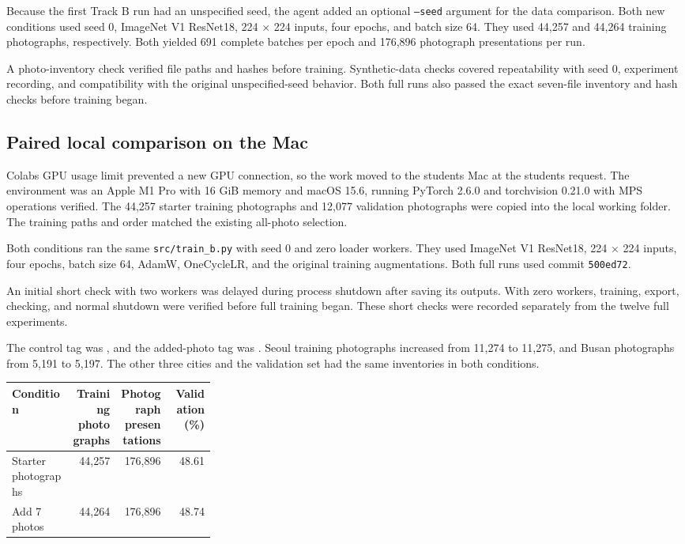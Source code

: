 \documentclass[11pt]{article}
\begin{document}
Because the first Track B run had an unspecified seed, the agent added an
optional \texttt{--seed} argument for the data comparison. Both new conditions
used seed 0, ImageNet V1 ResNet18, 224 $\times$ 224 inputs, four epochs, and
batch size 64. They used 44,257 and 44,264 training photographs, respectively.
Both yielded 691 complete batches per epoch and 176,896 photograph
presentations per run.

A photo-inventory check verified file paths and hashes before training.
Synthetic-data checks covered repeatability with seed 0, experiment recording,
and compatibility with the original unspecified-seed behavior. Both full
runs also passed the exact seven-file inventory and hash checks before
training began.

\subsection{Paired local comparison on the Mac}

Colab\textquotesingle{}s GPU usage limit prevented a new GPU connection, so the work moved to
the student\textquotesingle{}s Mac at the student\textquotesingle{}s request. The environment was an Apple
M1 Pro with 16 GiB memory and macOS 15.6, running PyTorch 2.6.0 and torchvision
0.21.0 with MPS operations verified. The 44,257 starter training photographs
and 12,077 validation photographs were copied into the local working folder.
The training paths and order matched the existing all-photo selection.

Both conditions ran the same \texttt{src/train\_b.py} with seed 0 and zero
loader workers. They used ImageNet V1 ResNet18, 224 $\times$ 224 inputs, four
epochs, batch size 64, AdamW, OneCycleLR, and the original training
augmentations. Both full runs used commit \texttt{500ed72}.

An initial short check with two workers was delayed during process shutdown
after saving its outputs. With zero workers, training, export, checking, and
normal shutdown were verified before full training began. These short checks
were recorded separately from the twelve full experiments.

The control tag was , and the added-photo tag was
. Seoul training photographs increased from 11,274 to
11,275, and Busan photographs from 5,191 to 5,197. The other three cities
and the validation set had the same inventories in both conditions.

\begin{center}\small
\begin{tabular}{p{0.30\linewidth}rrr}
\toprule
Condition & \shortstack{Training\\photographs} &
\shortstack{Photograph\\presentations} & \shortstack{Validation\\(\%)} \\
\midrule
Starter photographs & 44,257 & 176,896 & 48.61 \\
Add 7 photos & 44,264 & 176,896 & 48.74 \\
\bottomrule
\end{tabular}
\end{center}
\end{document}

